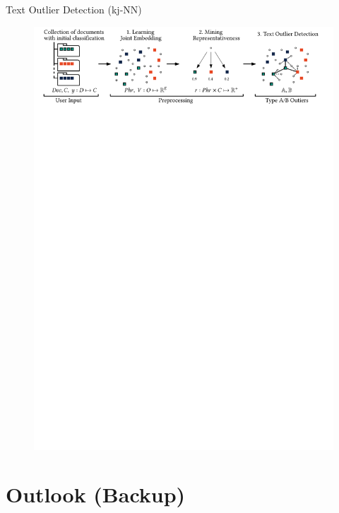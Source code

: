 \documentclass[16pt,usenames,dvipsnames, notheorems]{beamer}
\theoremstyle{definition}
\theoremstyle{example}
\theoremstyle{plain}
\begin{document}
\begin{frame}{Text Outlier Detection (kj-NN)}
\begin{figure}
	 \includegraphics[width=\linewidth]{figures/workflow5-compressed.pdf}
\end{figure}

\end{frame}

\section{Outlook (Backup)}
\end{document}
